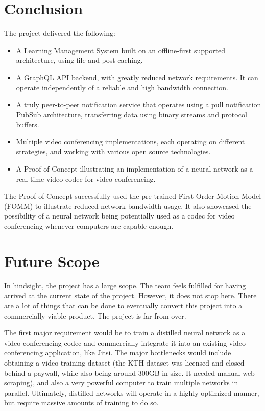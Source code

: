 \section{Conclusion}
The project delivered the following:
\begin{itemize}
    \item A Learning Management System built on an offline-first supported architecture, using file and post caching.
    \item A GraphQL API backend, with greatly reduced network requirements. It can operate independently of a reliable and high bandwidth connection.
    \item A truly peer-to-peer notification service that operates using a pull notification PubSub architecture, 
    transferring data using binary streams and protocol buffers.
    \item Multiple video conferencing implementations, each operating on different strategies, 
    and working with various open source technologies.
    \item A Proof of Concept illustrating an implementation of a neural network as a real-time video codec for video conferencing.
\end{itemize}

The Proof of Concept successfully used the pre-trained First Order Motion Model (FOMM) to illustrate reduced
network bandwidth usage. It also showcased the possibility of a neural network being potentially used as a codec for video conferencing whenever computers are capable enough.

\section{Future Scope}
In hindsight, the project has a large scope. The team feels fulfilled for having arrived at the current state of the project. 
However, it does not stop here. There are a lot of things that can be done to eventually convert this project into a commercially viable product. The project is far from over.

The first major requirement would be to train a distilled neural network as a video conferencing codec and commercially integrate it into an existing video conferencing application, like Jitsi. The major bottlenecks would include obtaining a video training dataset 
(the KTH dataset was licensed and closed behind a paywall, while also being around 300GB in size. It needed manual web scraping), and also a very powerful computer to train multiple networks in parallel. 
Ultimately, distilled networks will operate in a highly optimized manner, but require massive amounts of training to do so.

